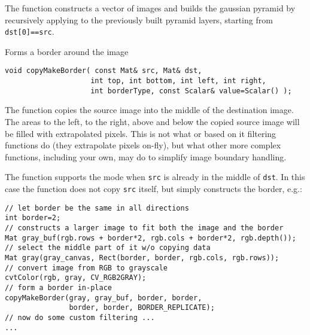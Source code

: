 The function constructs a vector of images and builds the gaussian pyramid by recursively applying  to the previously built pyramid layers, starting from \texttt{dst[0]==src}.

Forms a border around the image

\begin{lstlisting}
void copyMakeBorder( const Mat& src, Mat& dst,
                    int top, int bottom, int left, int right,
                    int borderType, const Scalar& value=Scalar() );
\end{lstlisting}
\begin{description}
\end{description}

The function copies the source image into the middle of the destination image. The areas to the left, to the right, above and below the copied source image will be filled with extrapolated pixels. This is not what  or based on it filtering functions do (they extrapolate pixels on-fly), but what other more complex functions, including your own, may do to simplify image boundary handling.

The function supports the mode when \texttt{src} is already in the middle of \texttt{dst}. In this case the function does not copy \texttt{src} itself, but simply constructs the border, e.g.:

\begin{lstlisting}
// let border be the same in all directions
int border=2;
// constructs a larger image to fit both the image and the border
Mat gray_buf(rgb.rows + border*2, rgb.cols + border*2, rgb.depth());
// select the middle part of it w/o copying data
Mat gray(gray_canvas, Rect(border, border, rgb.cols, rgb.rows));
// convert image from RGB to grayscale
cvtColor(rgb, gray, CV_RGB2GRAY);
// form a border in-place
copyMakeBorder(gray, gray_buf, border, border,
               border, border, BORDER_REPLICATE);
// now do some custom filtering ...
...
\end{lstlisting}

